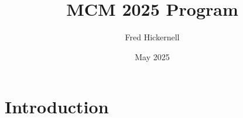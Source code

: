 \documentclass{article}
\title{MCM 2025 Program}
\author{Fred Hickernell}
\date{May 2025}
\begin{document}
\maketitle

\section{Introduction}
\end{document}
